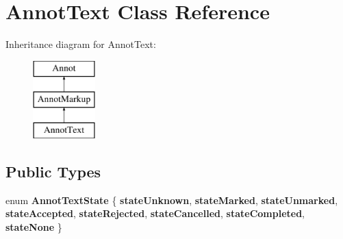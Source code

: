 \hypertarget{class_annot_text}{}\section{Annot\+Text Class Reference}
\label{class_annot_text}
Inheritance diagram for Annot\+Text\+:\begin{figure}[H]
\begin{center}
\leavevmode
\includegraphics[height=3.000000cm]{class_annot_text}
\end{center}
\end{figure}
\subsection*{Public Types}
\begin{DoxyCompactItemize}
\item 
\mbox{\label{class_annot_text_af6e36a7197d396d2db89c8f4c68e33c1}} 
enum {\bfseries Annot\+Text\+State} \{ \newline
{\bfseries state\+Unknown}, 
{\bfseries state\+Marked}, 
{\bfseries state\+Unmarked}, 
{\bfseries state\+Accepted}, 
\newline
{\bfseries state\+Rejected}, 
{\bfseries state\+Cancelled}, 
{\bfseries state\+Completed}, 
{\bfseries state\+None}
 \}
\end{DoxyCompactItemize}
